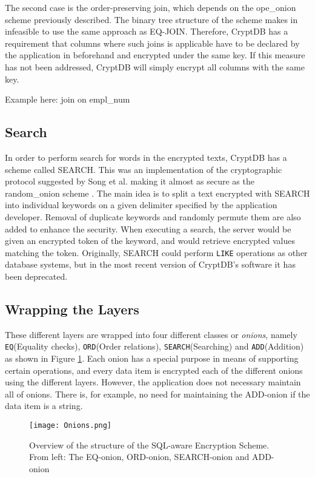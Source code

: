 The second case is the order-preserving join, which depends on the \gls{ope_onion} scheme previously described. The binary tree structure of the scheme makes in infeasible to use the same approach as EQ-JOIN. Therefore, CryptDB has a requirement that columns where such joins is applicable have to be declared by the application in beforehand and encrypted under the same key. If this measure has not been addressed, CryptDB will simply encrypt all columns with the same key.


Example here: join on empl\_num

\subsection{Search}
In order to perform search for words in the encrypted texts, CryptDB has a scheme called SEARCH. This was an implementation of the cryptographic protocol suggested by Song et al. making it almost as secure as the \gls{random_onion} scheme \citep{CryptDB_Main_Paper}. The main idea is to split a text encrypted with SEARCH into individual keywords on a given delimiter specified by the application developer. Removal of duplicate keywords and randomly permute them are also added to enhance the security. When executing a search, the server would be given an encrypted token of the keyword, and would retrieve encrypted values matching the token. Originally, SEARCH could perform \texttt{LIKE} operations as other database systems, but in the most recent version of CryptDB's software it has been deprecated. 

\subsection{Wrapping the Layers}

These different layers are wrapped into four different classes or \emph{onions}, namely \texttt{EQ}(Equality checks), \texttt{ORD}(Order relations), \texttt{SEARCH}(Searching) and \texttt{ADD}(Addition) as shown in Figure \ref{cryptdb_onions}. Each onion has a special purpose in means of supporting certain operations, and every data item is encrypted each of the different onions using the different layers. However, the application does not necessary maintain all of onions. There is, for example, no need for maintaining the ADD-onion if the data item is a string.

\begin{figure}[H]
	\texttt{[image: Onions.png]}
	\caption{Overview of the structure of the SQL-aware Encryption Scheme. From left: The EQ-onion, ORD-onion, SEARCH-onion and ADD-onion}
	\label{cryptdb_onions}
\end{figure}


